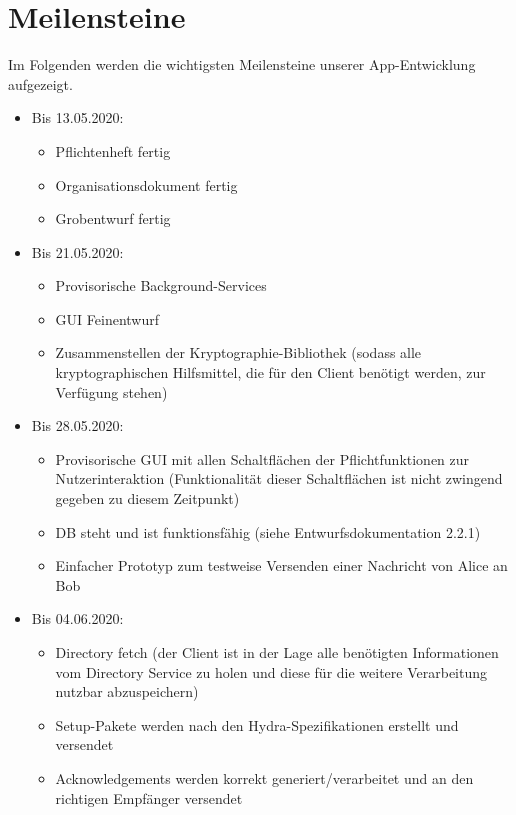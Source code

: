 \section{Meilensteine}
\label{sec:Meilensteine}
Im Folgenden werden die wichtigsten Meilensteine unserer App-Entwicklung aufgezeigt.

\begin{itemize}
	\item Bis 13.05.2020:
	\begin{itemize}
		\item Pflichtenheft fertig
		\item Organisationsdokument fertig
		\item Grobentwurf fertig
	\end{itemize}
	
	\item Bis 21.05.2020:
	\begin{itemize}
		\item Provisorische Background-Services
		\item GUI Feinentwurf
		\item Zusammenstellen der Kryptographie-Bibliothek (sodass alle kryptographischen Hilfsmittel, die für den Client benötigt werden, zur Verfügung stehen)
	\end{itemize}
		
	\item Bis 28.05.2020:
	\begin{itemize}
		\item Provisorische GUI mit allen Schaltflächen der Pflichtfunktionen zur
		Nutzerinteraktion (Funktionalität dieser Schaltflächen ist nicht zwingend gegeben zu diesem Zeitpunkt)
		\item DB steht und ist funktionsfähig (siehe Entwurfsdokumentation 2.2.1)
		\item Einfacher Prototyp zum testweise Versenden einer Nachricht von Alice an Bob
	\end{itemize}		
	
	\item Bis 04.06.2020:
	\begin{itemize}
		\item Directory fetch (der Client ist in der Lage alle benötigten Informationen vom Directory Service zu holen und diese für die weitere Verarbeitung nutzbar abzuspeichern)
		\item Setup-Pakete werden nach den Hydra-Spezifikationen erstellt und versendet
		\item Acknowledgements werden korrekt generiert/verarbeitet und an den
		richtigen Empfänger versendet
	\end{itemize}		
	

\end{itemize}
